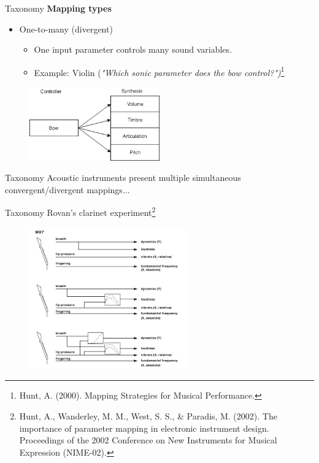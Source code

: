 \documentclass{beamer}
\begin{document}
\begin{frame}{Taxonomy}
    \textbf{Mapping types}\\
    \vspace{5mm}
    \begin{itemize}
        \item One-to-many (divergent)
        \begin{itemize}
            \item One input parameter controls many sound variables.
            \item Example: Violin (\textit{"Which sonic parameter does the bow control?")}\footnote{Hunt, A. (2000). Mapping Strategies for Musical Performance.}
         \end{itemize}
    \end{itemize}
    \begin{figure}[h]
        \includegraphics[width=0.5\textwidth]{violin_mapping2.png}
    \end{figure}
\end{frame}

\begin{frame}{Taxonomy}
    Acoustic instruments present multiple simultaneous convergent/divergent mappings...
\end{frame}

\begin{frame}{Taxonomy}
    Rovan's clarinet experiment\footnote{Hunt, A., Wanderley, M. M., West, S. S., \& Paradis, M. (2002). The importance of parameter mapping in electronic instrument design. Proceedings of the 2002 Conference on New Instruments for Musical Expression (NIME-02).}
        \begin{figure}[h]
        \includegraphics[width=0.6\textwidth]{clarinet_mapping.png}
    \end{figure}
\end{frame}
\end{document}
